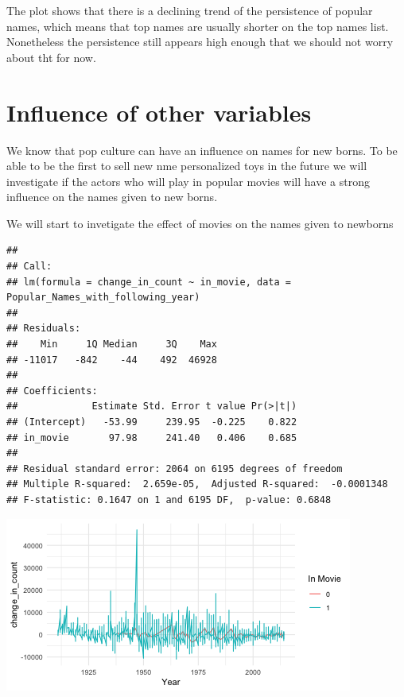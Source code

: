 \documentclass[11pt,preprint, authoryear]{elsarticle}
\let\origfigure\figure
\let\endorigfigure\endfigure
\renewenvironment{figure}[1][2] {
    \expandafter\origfigure\expandafter[H]
} {
    \endorigfigure
}
\numberwithin{equation}{section}
\numberwithin{figure}{section}
\numberwithin{table}{section}
\begin{document}
The plot shows that there is a declining trend of the persistence of
popular names, which means that top names are usually shorter on the top
names list. Nonetheless the persistence still appears high enough that
we should not worry about tht for now.

\hypertarget{influence-of-other-variables}{%
\section{\texorpdfstring{Influence of other variables
\label{Meth}}{Influence of other variables }}\label{influence-of-other-variables}}

We know that pop culture can have an influence on names for new borns.
To be able to be the first to sell new nme personalized toys in the
future we will investigate if the actors who will play in popular movies
will have a strong influence on the names given to new borns.

We will start to invetigate the effect of movies on the names given to
newborns

\begin{verbatim}
## 
## Call:
## lm(formula = change_in_count ~ in_movie, data = Popular_Names_with_following_year)
## 
## Residuals:
##    Min     1Q Median     3Q    Max 
## -11017   -842    -44    492  46928 
## 
## Coefficients:
##             Estimate Std. Error t value Pr(>|t|)
## (Intercept)   -53.99     239.95  -0.225    0.822
## in_movie       97.98     241.40   0.406    0.685
## 
## Residual standard error: 2064 on 6195 degrees of freedom
## Multiple R-squared:  2.659e-05,  Adjusted R-squared:  -0.0001348 
## F-statistic: 0.1647 on 1 and 6195 DF,  p-value: 0.6848
\end{verbatim}

\begin{figure}[H]

{\centering \includegraphics{Question1_files/figure-latex/Figure3-1} 

}

\caption{Caption Here \label{Figure3}}\label{fig:Figure3}
\end{figure}
\end{document}

